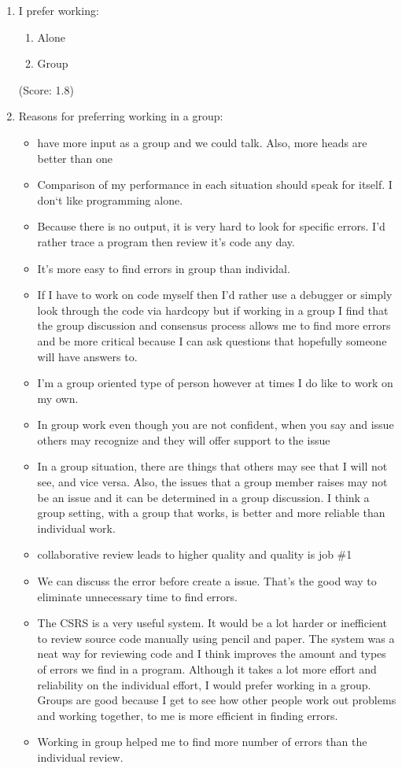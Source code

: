 \begin{enumerate}
\item  I prefer working:
  \begin{enumerate}
     \item[(1)] Alone 
     \item[(2)] Group
  \end{enumerate} 
(Score: 1.8)

\item  Reasons for preferring working in a group: 
\begin{itemize}
\item have more input as a group and we could talk.
Also, more heads are better than one

\item Comparison of my performance in each situation should speak for itself.
I don`t like programming alone.
\item Because there is no output, it is very hard to look for specific
errors.  I'd rather trace a program then review it's code any day.

\item It's more easy to find errors in group than individal.
\item If I have to work on code myself then I'd rather use a debugger or
simply look through the code via hardcopy but if working in a group I
find that the group discussion and consensus process allows me to find
more errors and be more critical because I can ask questions that
hopefully someone will have answers to.
\item I'm a group oriented type of person however at times I do like to work
on my own.

\item In group work even though you are not confident,
when you say and issue others may recognize and they will offer
support to the issue
\item In a group situation, there are things that others may see that I will
not see, and vice versa.  Also, the issues that a group member raises
may not be an issue and it can be determined in a group discussion.  I
think a group setting, with a group that works, is better and more
reliable than individual work.
\item collaborative review leads to higher quality and quality is job \#1
\item We can discuss the error before create a issue.  That's the good way
to eliminate unnecessary time to find errors.

\item The CSRS is a very useful system.  It would be a lot harder or
inefficient to review source code manually using pencil and paper. The
system was a neat way for reviewing code and I think improves the
amount and types of errors we find in a program.  Although it takes a
lot more effort and reliability on the individual effort, I would
prefer working in a group.  Groups are good because I get to see how
other people work out problems and working together, to me is more
efficient in finding errors. 
\item Working in group helped me to find more number of errors than the
individual review.


\end{itemize}
\end{enumerate}

